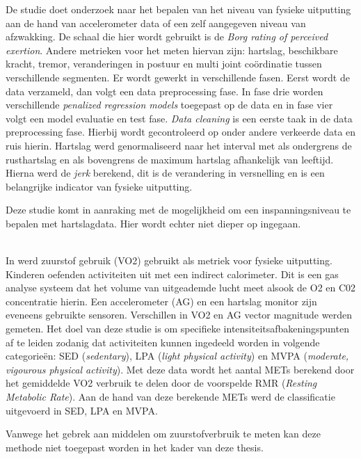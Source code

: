 De studie \citep{ref5} doet onderzoek naar het bepalen van het niveau van fysieke uitputting aan de hand van accelerometer data of een zelf aangegeven niveau van afzwakking.
De schaal die hier wordt gebruikt is de \textit{Borg rating of perceived exertion}. Andere metrieken voor het meten hiervan zijn: hartslag, beschikbare kracht, tremor, veranderingen in postuur en multi joint coördinatie tussen verschillende segmenten. 
Er wordt gewerkt in verschillende fasen. Eerst wordt de data verzameld, dan volgt een data preprocessing fase. In fase drie worden verschillende \textit{penalized regression models} toegepast op de data en in fase vier volgt een model evaluatie en test fase.
\textit{Data cleaning} is een eerste taak in de data preprocessing fase. Hierbij wordt gecontroleerd op onder andere verkeerde data en ruis hierin.
Hartslag werd genormaliseerd naar het interval met als ondergrens de rusthartslag en als bovengrens de maximum hartslag afhankelijk van leeftijd. 
Hierna werd de \textit{jerk} berekend, dit is de verandering in versnelling en is een belangrijke indicator van fysieke uitputting. 

Deze studie komt in aanraking met de mogelijkheid om een inspanningsniveau te bepalen met hartslagdata. Hier wordt echter niet dieper op ingegaan.

\\

In \citep{ref18} werd zuurstof gebruik (VO2) gebruikt als metriek voor fysieke uitputting. Kinderen oefenden activiteiten uit met een indirect calorimeter. Dit is een gas analyse systeem dat het volume van uitgeademde lucht meet alsook de O2 en C02 concentratie hierin. Een accelerometer (AG) en een hartslag monitor zijn eveneens gebruikte sensoren. Verschillen in VO2 en AG vector magnitude werden gemeten. Het doel van deze studie is om specifieke intensiteitsafbakeningspunten af te leiden zodanig dat activiteiten kunnen ingedeeld worden in volgende categorieën: SED (\textit{sedentary}), LPA (\textit{light physical activity}) en MVPA (\textit{moderate, vigourous physical activity}).
Met deze data wordt het aantal METs berekend door het gemiddelde VO2 verbruik te delen door de voorspelde RMR (\textit{Resting Metabolic Rate}). Aan de hand van deze berekende METs werd de classificatie uitgevoerd in SED, LPA en MVPA.

Vanwege het gebrek aan middelen om zuurstofverbruik te meten kan deze methode niet toegepast worden in het kader van deze thesis.\\


